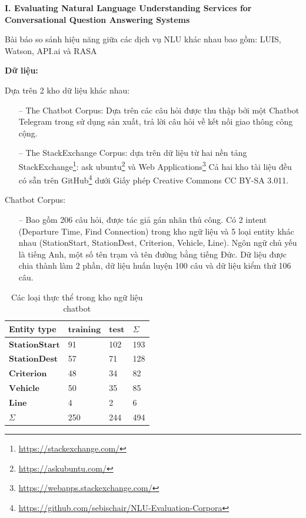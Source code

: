 \textbf{I. Evaluating Natural Language Understanding Services for Conversational Question Answering Systems}

Bài báo so sánh hiệu năng giữa các dịch vụ NLU khác nhau bao gồm: LUIS, Watson, API.ai và RASA

\textbf{Dữ liệu:}

Dựa trên 2 kho dữ liệu khác nhau:
\begin{itemize}
    \item[--] The Chatbot Corpus: Dựa trên các câu hỏi được thu thập bởi một Chatbot Telegram trong sử dụng sản xuất, trả lời câu hỏi về kết nối giao thông công cộng.
    \item[--] The StackExchange Corpus: dựa trên dữ liệu từ hai nền tảng StackExchange\footnote{\url{https://stackexchange.com/}}: ask ubuntu\footnote{\url{https://askubuntu.com/}} và Web Applications\footnote{\url{https://webapps.stackexchange.com/}} Cả hai kho tài liệu đều có sẵn trên GitHub\footnote{\url{https://github.com/sebischair/NLU-Evaluation-Corpora}}  dưới Giấy phép Creative Commons CC BY-SA 3.011.
\end{itemize}

Chatbot Corpus:

\begin{itemize}
    \item[--] Bao gồm 206 câu hỏi, được tác giả gán nhãn thủ công. Có 2 intent (Departure Time, Find Connection) trong kho ngữ liệu và 5 loại entity khác nhau (StationStart, StationDest, Criterion, Vehicle, Line). Ngôn ngữ chủ yếu là tiếng Anh, một số tên trạm và tên đường bằng tiếng Đức. Dữ liệu được chia thành làm 2 phần, dữ liệu huấn luyện 100 câu và dữ liệu kiểm thử 106 câu.
\end{itemize}




\begin{table}[]
\begin{center}
\begin{tabular}{|l|l|l|l|}
\hline
Entity type           & $\textbf{training}$ & $\textbf{test}$ & $\Sigma$   \\ \hline
$\textbf{StationStart}$ & 91                & 102           & 193 \\ \hline
$\textbf{StationDest}$  & 57                & 71            & 128 \\ \hline
$\textbf{Criterion}$    & 48                & 34            & 82  \\ \hline
$\textbf{Vehicle}$      & 50                & 35            & 85  \\ \hline
$\textbf{Line}$         & 4                 & 2             & 6   \\ \hline
$\Sigma$                    & 250               & 244           & 494 \\ \hline

\end{tabular}
\caption{Các loại thực thể trong kho ngữ liệu chatbot}
\label{fig:comparisonimg-1}
\end{center}
\end{table}


